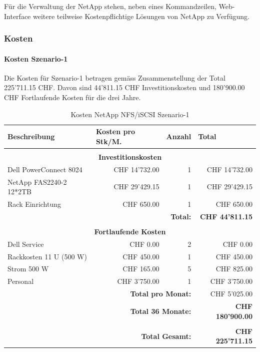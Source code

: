 Für die Verwaltung der NetApp stehen, neben eines Kommandzeilen, Web-Interface weitere teilweise Kostenpflichtige Lösungen von NetApp zu Verfügung. 

\subsubsection*{Kosten}

\paragraph*{Kosten Szenario-1}
Die Kosten für Szenario-1 betragen gemäss Zusammenstellung der Total 225'711.15 CHF. Davon sind 44'811.15 CHF Investitionskosten und 180'900.00 CHF Fortlaufende Kosten für die drei Jahre.

\begin{table}[htbp]
\caption{Kosten NetApp NFS/iSCSI Szenario-1}
\begin{small}
\begin{tabular}{|l|r|r|r|}
\hline
\textbf{Beschreibung} & \multicolumn{1}{l|}{\textbf{Kosten pro Stk/M.}} & \multicolumn{1}{l|}{\textbf{Anzahl}} & \multicolumn{1}{l|}{\textbf{Total}} \\ \hline
 \multicolumn{ 4}{c}{} \\ \hline
\multicolumn{ 4}{|c|}{\textbf{Investitionskosten}} \\ \hline
Dell PowerConnect 8024 & CHF 14'732.00 & 1 & CHF 14'732.00 \\ \hline
NetApp FAS2240-2 12*2TB & CHF 29'429.15 & 1 & CHF 29'429.15 \\ \hline
Rack Einrichtung & CHF 650.00 & 1 & CHF 650.00 \\ \hline \hline
 \multicolumn{ 3}{r|}{\textbf{Total:}} & \textbf{CHF 44'811.15} \\ 
 \cline{4-4}
\multicolumn{ 4}{c}{} \\ \hline
\multicolumn{ 4}{|c|}{\textbf{Fortlaufende Kosten}} \\ \hline
Dell Service & CHF 0.00 & 2 & CHF 0.00 \\ \hline
Rackkosten 11 U (500 W) & CHF 450.00 & 1 & CHF 450.00 \\ \hline
Strom 500 W & CHF 165.00 & 5 & CHF 825.00 \\ \hline
Personal & CHF 3'750.00 & 1 & CHF 3'750.00 \\ \hline \hline
 \multicolumn{ 3}{r|}{\textbf{Total pro Monat:}} & CHF 5'025.00 \\
\cline{4-4}
 \multicolumn{ 3}{r|}{\textbf{Total 36 Monate:}} & \textbf{CHF 180'900.00} \\ \cline{4-4}
 \multicolumn{ 4}{c}{} \\ \cline{4-4}
 \multicolumn{ 3}{r|}{\textbf{Total Gesamt:}} & \textbf{CHF 225'711.15} \\ \cline{4-4}
\end{tabular}
\end{small}
\label{KostenNetAppS1}
\end{table}


